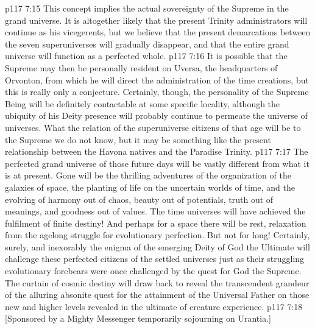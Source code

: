 \vs p117 7:15 This concept implies the actual sovereignty of the Supreme in the grand universe. It is altogether likely that the present Trinity administrators will continue as his vicegerents, but we believe that the present demarcations between the seven superuniverses will gradually disappear, and that the entire grand universe will function as a perfected whole.
\vs p117 7:16 It is possible that the Supreme may then be personally resident on Uversa, the headquarters of Orvonton, from which he will direct the administration of the time creations, but this is really only a conjecture. Certainly, though, the personality of the Supreme Being will be definitely contactable at some specific locality, although the ubiquity of his Deity presence will probably continue to permeate the universe of universes. What the relation of the superuniverse citizens of that age will be to the Supreme we do not know, but it may be something like the present relationship between the Havona natives and the Paradise Trinity.
\vs p117 7:17 \pc The perfected grand universe of those future days will be vastly different from what it is at present. Gone will be the thrilling adventures of the organization of the galaxies of space, the planting of life on the uncertain worlds of time, and the evolving of harmony out of chaos, beauty out of potentials, truth out of meanings, and goodness out of values. The time universes will have achieved the fulfilment of finite destiny! And perhaps for a space there will be rest, relaxation from the agelong struggle for evolutionary perfection. But not for long! Certainly, surely, and inexorably the enigma of the emerging Deity of God the Ultimate will challenge these perfected citizens of the settled universes just as their struggling evolutionary forebears were once challenged by the quest for God the Supreme. The curtain of cosmic destiny will draw back to reveal the transcendent grandeur of the alluring absonite quest for the attainment of the Universal Father on those new and higher levels revealed in the ultimate of creature experience.
\vsetoff
\vs p117 7:18 [Sponsored by a Mighty Messenger temporarily sojourning on Urantia.]
\quizlink
